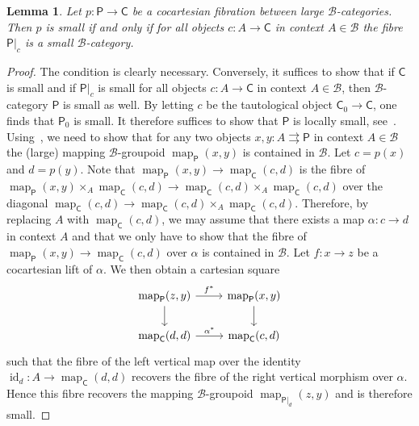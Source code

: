 \documentclass[reqno]{amsart}
\numberwithin{equation}{subsection}
\theoremstyle{plain}
\newtheorem{lemma}[equation]{Lemma}
\theoremstyle{definition}
\let\scr=\mathcal
\def\BB{\scr B}
\DeclareMathOperator{\id}{id}
\DeclareMathOperator{\Map}{map}
\newcommand{\map}[1]{\Map_{#1}}
\newcommand{\I}[1]{\mathsf{#1}}
\begin{document}
\begin{lemma}
	\label{lem:characterisationSmallCocartesianFibration}
	Let $p\colon\I{P}\to\I{C}$ be a cocartesian fibration between large $\BB$-categories. Then $p$ is small if and only if for all objects $c\colon A\to \I{C}$ in context $A\in \BB$ the fibre $\I{P}\vert_c$ is a small $\BB$-category.
\end{lemma}
\begin{proof}
	The condition is clearly necessary. Conversely, it suffices to show that if $\I{C}$ is small and if $\I{P}\vert_c$ is small for all objects $c\colon A\to \I{C}$ in context $A\in\BB$, then $\BB$-category $\I{P}$ is small as well. By letting $c$ be the tautological object $\I{C}_0\to \I{C}$, one finds that $\I{P}_0$ is small. It therefore suffices to show that $\I{P}$ is locally small, see~\cite[Proposition~4.7.4]{Martini2021}. Using~\cite[Proposition~4.7.2]{Martini2021}, we need to show that for any two objects $x,y\colon A\rightrightarrows \I{P}$ in context $A\in\BB$ the (large) mapping $\BB$-groupoid $\map{\I{P}}(x,y)$ is contained in $\BB$. Let $c=p(x)$ and $d=p(y)$. Note that $\map{\I{P}}(x,y)\to \map{\I{C}}(c,d)$ is the fibre of $\map{\I{P}}(x,y)\times_A\map{\I{C}}(c,d)\to\map{\I{C}}(c,d)\times_A\map{\I{C}}(c,d)$ over the diagonal $\map{\I{C}}(c,d)\to\map{\I{C}}(c,d)\times_A\map{\I{C}}(c,d)$. Therefore, by replacing $A$ with $\map{\I{C}}(c,d)$, we may assume that there exists a map $\alpha\colon c\to d$ in context $A$ and that we only have to show that the fibre of $\map{\I{P}}(x,y)\to\map{\I{C}}(c,d)$ over $\alpha$ is contained in $\BB$. Let $f\colon x\to z$ be a cocartesian lift of $\alpha$. We then obtain a cartesian square
	\begin{equation*}
	\begin{tikzcd}
		\map{\I{P}}(z,y)\arrow[r, "f^\ast"]\arrow[d] & \map{\I{P}}(x,y)\arrow[d]\\
		\map{\I{C}}(d,d)\arrow[r, "\alpha^\ast"] & \map{\I{C}}(c,d)
	\end{tikzcd}
	\end{equation*}
	such that the fibre of the left vertical map over the identity $\id_d\colon A\to \map{\I{C}}(d,d)$ recovers the fibre of the right vertical morphism over $\alpha$. Hence this fibre recovers the mapping $\BB$-groupoid $\map{\I{P}\vert_d}(z,y)$ and is therefore small.
\end{proof}
\end{document}
